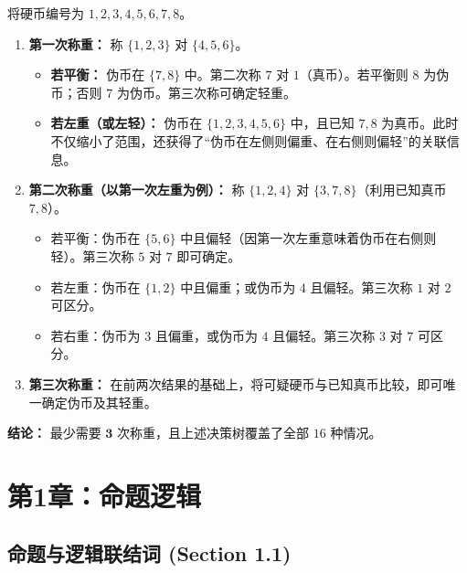 \documentclass[11pt,UTF8]{article}
\begin{document}
将硬币编号为 $1,2,3,4,5,6,7,8$。

\begin{enumerate}[1.]
    \item \textbf{第一次称重：} 称 $\{1,2,3\}$ 对 $\{4,5,6\}$。
    \begin{itemize}
        \item \textbf{若平衡：} 伪币在 $\{7,8\}$ 中。第二次称 $7$ 对 $1$（真币）。若平衡则 $8$ 为伪币；否则 $7$ 为伪币。第三次称可确定轻重。
        \item \textbf{若左重（或左轻）：} 伪币在 $\{1,2,3,4,5,6\}$ 中，且已知 $7,8$ 为真币。此时不仅缩小了范围，还获得了“伪币在左侧则偏重、在右侧则偏轻”的关联信息。
    \end{itemize}
    
    \item \textbf{第二次称重（以第一次左重为例）：} 称 $\{1,2,4\}$ 对 $\{3,7,8\}$（利用已知真币 $7,8$）。
    \begin{itemize}
        \item 若平衡：伪币在 $\{5,6\}$ 中且偏轻（因第一次左重意味着伪币在右侧则轻）。第三次称 $5$ 对 $7$ 即可确定。
        \item 若左重：伪币在 $\{1,2\}$ 中且偏重；或伪币为 $4$ 且偏轻。第三次称 $1$ 对 $2$ 可区分。
        \item 若右重：伪币为 $3$ 且偏重，或伪币为 $4$ 且偏轻。第三次称 $3$ 对 $7$ 可区分。
    \end{itemize}
    
    \item \textbf{第三次称重：} 在前两次结果的基础上，将可疑硬币与已知真币比较，即可唯一确定伪币及其轻重。
\end{enumerate}

\textbf{结论：} 最少需要 $\mathbf{3}$ 次称重，且上述决策树覆盖了全部 $16$ 种情况。

\newpage
\section{第1章：命题逻辑}

\subsection{命题与逻辑联结词 (Section 1.1)}
\end{document}
